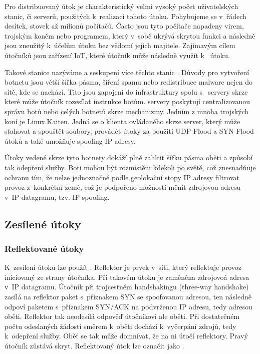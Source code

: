 Pro distribuovaný  útok je charakteristický velmi vysoký počet uživatelských stanic,
či serverů, použitých k~realizaci tohoto útoku. Pohybujeme se v~řádech desítek, stovek až
milionů počítačů. 
Často jsou tyto počítače napadeny virem, trojským koněm nebo programem, který v~sobě ukrývá
skrytou funkci a následně jsou zneužitý k~účelům  útoku bez vědomí jejich majitele.
Zajímavým cílem útočníků jsou zařízení IoT, které útočník může následně využít k~
útoku.

Takové stanice nazýváme  a seskupení více těchto stanic . Důvody pro
vytvoření botnetu jsou větší šířka pásma, šíření spamu nebo redistribuce malware nejen do sítě,
kde se  nachází. Tito  jsou zapojeni do  infrastruktury spolu
s~ servery skrze které může útočník rozesílat instrukce botům. %
 servery poskytují centralizovanou správu botů nebo celých botnetů skrze 
mechanizmy. Jedním z mnoha trojských koní je Linux.Kaiten. Jedná se o klienta ovládaného skrze
 server, který může stahovat a spouštět soubory, provádět  útoky za
použití UDP Flood a SYN Flood útoků a také umožňuje spoofing IP adresy.

Útoky vedené skrze tyto botnety dokáží plně zahltit šířku pásma oběti a způsobí tak odepření
služby. 
Boti mohou být rozmístěni kdekoli po světě, což znesnadňuje ochranu tím, že nelze
jednoznačně podle geolokační stopy IP adresy filtrovat provoz z~konkrétní země, což je
podpořeno možností měnit zdrojovou adresu v~IP datagramu, tzv. IP spoofing.

\subsection{Zesílené útoky}
\subsubsection{Reflektované útoky}
\label{subsec:reflektovane_utoky}
K~zesílení útoku lze použít . Reflektor je prvek v~síti, který reflektuje provoz
iniciovaný ze strany útočníka. Při takovém útoku je  zaměněna zdrojovoá adresa
v~IP datagramu. Útočník při trojcestném handshakingu (three-way handshake) zasílá na reflektor
paket s~příznakem SYN se spoofovanou adresou, ten následně odpoví paketem s~příznakem SYN/ACK
na podvrženou IP adresu, tedy adresou oběti. Reflektor tak neodesílá odpověď útočníkovi ale
oběti. Při dostatečném počtu odeslaných žádostí směrem k~oběti dochází k~vyčerpání zdrojů, tedy
k~odepření služby. Oběť se tak může domnívat, že na ni útočí reflektory. Pravý útočník zůstává
skryt. Reflektovaný útok lze označit jako .

